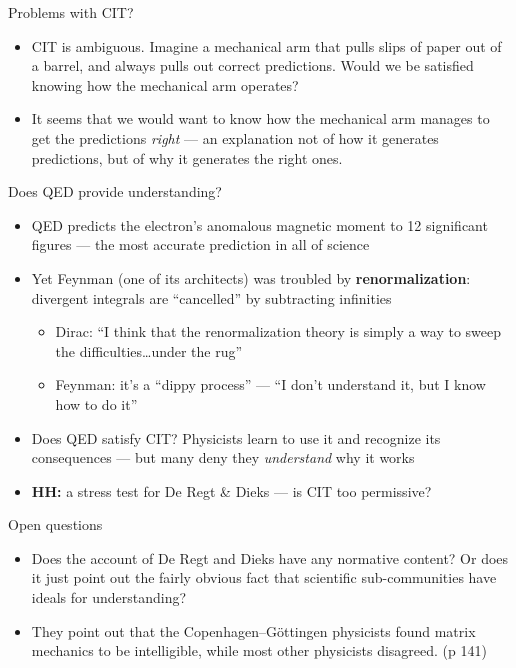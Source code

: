 \documentclass[fleqn]{beamer}
\begin{document}
\begin{frame}{Problems with CIT?}

  \begin{itemize}
  \item CIT is ambiguous. Imagine a mechanical arm that pulls slips of
    paper out of a barrel, and always pulls out correct predictions.
    Would we be satisfied knowing how the mechanical arm operates?
  \item It seems that we would want to know how the mechanical arm
    manages to get the predictions \emph{right} --- an explanation not
    of how it generates predictions, but of why it generates the right
    ones.
  \end{itemize}

\end{frame}

\begin{frame}{Does QED provide understanding?}

  \begin{itemize}
  \item QED predicts the electron's anomalous magnetic moment to
    12 significant figures --- the most accurate prediction in
    all of science
  \item Yet Feynman (one of its architects) was troubled by
    \textbf{renormalization}: divergent integrals are ``cancelled'' by
    subtracting infinities
    \begin{itemize}
    \item Dirac: ``I think that the renormalization theory is simply a
      way to sweep the difficulties\dots under the rug''
    \item Feynman: it's a ``dippy process'' --- ``I don't understand
      it, but I know how to do it''
    \end{itemize}
  \item Does QED satisfy CIT? Physicists learn to use it and
    recognize its consequences --- but many deny they \emph{understand}
    why it works
  \item \textbf{HH:} a stress test for De Regt \& Dieks --- is
    CIT too permissive?
  \end{itemize}

\end{frame}

\begin{frame}{Open questions}

  \begin{itemize}
  \item Does the account of De Regt and Dieks have any normative
    content? Or does it just point out the fairly obvious fact that
    scientific sub-communities have ideals for understanding?
  \item They point out that the Copenhagen--G{\"o}ttingen physicists
    found matrix mechanics to be intelligible, while most other
    physicists disagreed. (p 141)
  \end{itemize}

\end{frame}
\end{document}
